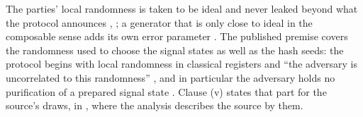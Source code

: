 
The parties' local randomness is taken to be ideal and never leaked beyond
what the protocol announces \cite[Sec.~4, opening paragraphs]{tupkary2026decoy},
\cite[Sec.~3]{tupkary2025survey}; a generator that is only close to ideal
in the composable sense adds its own error parameter
\cite[Sec.~5.6.1]{tupkary2025survey}. The published premise covers the
randomness used to choose the signal states as well as the hash seeds: the
protocol begins with local randomness in classical registers and ``the
adversary is uncorrelated to this randomness''
\cite[Sec.~4, opening paragraphs]{tupkary2026decoy}, and in particular the
adversary holds no purification of a prepared signal state
\cite[Protocol~1, step 1(a)(i)]{tupkary2026decoy}. Clause (v) states that
part for the source's draws, in , where the analysis
describes the source by them.

